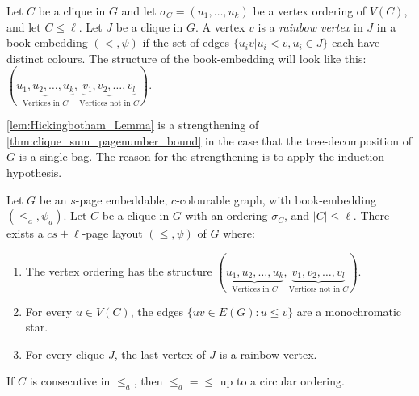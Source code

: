 Let \(C\) be a clique in \(G\) and let \(\sigma_C = (u_1, \ldots , u_k)\) be a vertex ordering of \(V(C)\), and let \(C \leq \ell \). Let $J$ be a clique in $G$. A vertex $v$ is a \textit{rainbow vertex} in $J$ in a book-embedding $(<, \psi)$ if the set of edges $\{u_i v | u_i < v, u_i \in J\}$ each have distinct colours. The structure of the book-embedding will look like this: \((\underbrace{u_1, u_2, \ldots, u_k}_{\text{Vertices in } C}, \underbrace{v_1, v_2, \ldots, v_l}_{\text{Vertices not in }C})\).

\cref{lem:Hickingbotham_Lemma} is a strengthening of \cref{thm:clique_sum_pagenumber_bound} in the case that the tree-decomposition of $G$ is a single bag. The reason for the strengthening is to apply the induction hypothesis.
\begin{lemma}\label{lem:Hickingbotham_Lemma}
	Let \(G\) be an $s$-page embeddable, $c$-colourable graph, with book-embedding \((\leq_a, \psi_a)\). Let $C$ be a clique in $G$ with an ordering \(\sigma_C\), and $|C| \leq \ell$. There exists a \(cs + \ell\)-page layout \((\leq, \psi)\) of \(G\) where:
	\begin{enumerate}
		\item The vertex ordering has the structure \((\underbrace{u_1, u_2, \ldots, u_k}_{\text{Vertices in } C}, \underbrace{v_1, v_2, \ldots, v_l}_{\text{Vertices not in }C})\).
		\item For every \(u \in V(C)\), the edges \(\lbrace uv \in E(G) : u \leq v \rbrace\) are a monochromatic star.
		\item For every clique \(J\), the last vertex of \(J\) is a rainbow-vertex.
	\end{enumerate}

	If $C$ is consecutive in $\leq_a$, then $\leq_a = \leq$ up to a circular ordering.
\end{lemma}
